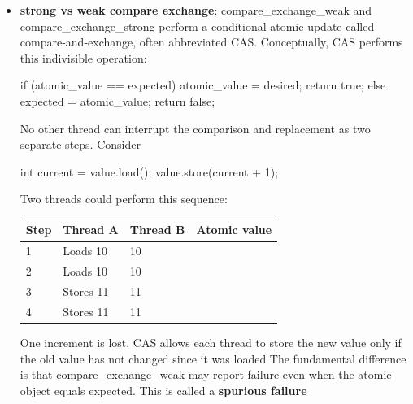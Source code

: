 \documentclass{report}
\begin{document}
\begin{itemize}
\begin{cppcode}
                int expected = 10;

                bool changed = value.compare_exchange_strong(expected, 20);
            \end{cppcode}
        \item \textbf{strong vs weak compare exchange}: compare\_exchange\_weak and compare\_exchange\_strong perform a conditional atomic update called compare-and-exchange, often abbreviated CAS.
            \bigbreak \noindent 
            Conceptually, CAS performs this indivisible operation:
            \bigbreak \noindent 
            \begin{cppcode}
                if (atomic_value == expected) {
                    atomic_value = desired;
                    return true;
                } else {
                    expected = atomic_value;
                    return false;
                }
            \end{cppcode}
            \bigbreak \noindent 
            No other thread can interrupt the comparison and replacement as two separate steps.
            \bigbreak \noindent 
            Consider
            \bigbreak \noindent 
            \begin{cppcode}
                int current = value.load();
                value.store(current + 1);
            \end{cppcode}
            \bigbreak \noindent 
            Two threads could perform this sequence:
            \begin{center}
                \begin{tabularx}{\textwidth}{@{}XXXX@{}}
                    \toprule
                    \textbf{Step}&	\textbf{Thread A}&	\textbf{Thread B}& \textbf{Atomic value} \\
                    \midrule
                    1	&Loads 10		&10\\[2ex]
                    2	&	Loads 10	&10\\[2ex]
                    3	&Stores 11		&11\\[2ex]
                    4	&	Stores 11	&11 \\
                    \bottomrule
                \end{tabularx}
            \end{center}
            One increment is lost. CAS allows each thread to store the new value only if the old value has not changed since it was loaded
            \bigbreak \noindent 
            The fundamental difference is that compare\_exchange\_weak may report failure even when the atomic object equals expected. This is called a \textbf{spurious failure}

\end{itemize}
\end{document}
